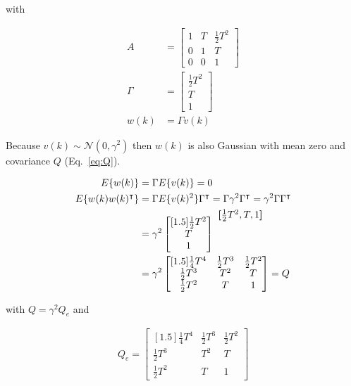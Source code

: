 \documentclass[fleqn,12pt]{article}
\newenvironment{rowvector}
 {\bm{[}\begin{matrix}}
 {\end{matrix}\bm{]}}
\begin{document}
\noindent with 

\begin{align}
    A&=\begin{bmatrix}
           1 & T & \frac{1}{2}T^2\\
          0 & 1 & T\\
          0 & 0 & 1
    \end{bmatrix}\\
    \Gamma&=\begin{bmatrix}
               \frac{1}{2}T^2\\
               T\\
               1
            \end{bmatrix}\nonumber\\
    w(k)&=\Gamma v(k)\nonumber
\end{align}

Because $v(k)\sim\mathcal{N}(0,\gamma^2)$ then $w(k)$ is also Gaussian with
mean zero and covariance $Q$ (Eq.~\ref{eq:Q}).

\begin{align}
    E\{w(k)\}&=\Gamma E\{v(k)\}=0\nonumber{}\\
    E\{w(k)w(k)^\intercal\}&=\Gamma E\{v(k)^2\}\Gamma^\intercal=\Gamma\gamma^2\Gamma^\intercal=\gamma^2\Gamma\Gamma^\intercal\nonumber\\
     &=\gamma^2\begin{bmatrix}[1.5]
         \frac{1}{2}T^2\\
         T\\
         1
       \end{bmatrix}
     \raisebox{4.5ex}{
         $\begin{rowvector}\frac{1}{2}T^2, T, 1\end{rowvector}$
     }\nonumber\\
     &=\gamma^2\begin{bmatrix}[1.5]
                   \frac{1}{4}T^4&\frac{1}{2}T^3&\frac{1}{2}T^2\\
                   \frac{1}{2}T^3&T^2&T\\
                   \frac{1}{2}T^2&T&1
     \end{bmatrix}=Q
\end{align}

\noindent with $Q=\gamma^2Q_e$ and

\begin{align}
    Q_e=\begin{bmatrix}[1.5]
             \frac{1}{4}T^4&\frac{1}{2}T^3&\frac{1}{2}T^2\\
             \frac{1}{2}T^3&T^2&T\\
             \frac{1}{2}T^2&T&1
        \end{bmatrix}\label{eq:Qe}
\end{align}
\end{document}
